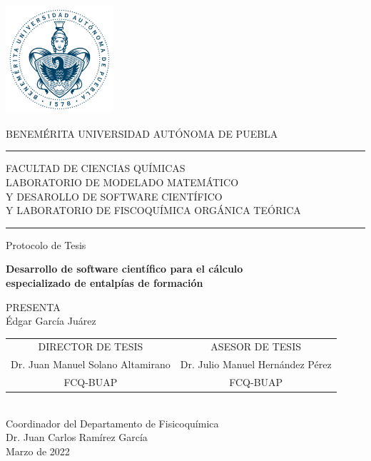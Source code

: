\documentclass[12pt]{article}
\newcommand\vtab[1][0.5cm]{\vspace*{#1}}
\begin{document}
\pagestyle{empty} 
\phantom{a}
\vspace{-1.4cm}
\begin{center}
\includegraphics[width=4cm]{Images/buap2014.png}

BENEMÉRITA UNIVERSIDAD AUTÓNOMA DE PUEBLA\\
\rule{150mm}{0.1mm}
\begin{small}
FACULTAD DE CIENCIAS QUÍMICAS\\
LABORATORIO DE MODELADO MATEMÁTICO\\
Y DESAROLLO DE SOFTWARE CIENTÍFICO\\
Y LABORATORIO DE FISCOQUÍMICA ORGÁNICA TEÓRICA\\
\end{small}
\rule{150mm}{0.1mm}

\vtab[.1cm]
\Large{Protocolo de Tesis}\\
\vtab[0.2cm]

\large{\textbf{Desarrollo de software científico para el cálculo\\
especializado de entalpías de formación}}\\
\vtab[0.2cm]

PRESENTA \\
Édgar García Juárez \\
\vtab[0.5cm]
\begin{tabular}{cc}
DIRECTOR DE TESIS & ASESOR DE TESIS \\ 
Dr. Juan Manuel Solano Altamirano & Dr. Julio Manuel Hernández Pérez \\ 
FCQ-BUAP & FCQ-BUAP \\ 
\end{tabular} 
\vtab[0.7cm] \\
\large{Coordinador del Departamento de Fisicoquímica\\
Dr. Juan Carlos Ramírez García}\\
\vtab[0.2cm]
{\small Marzo de 2022}
\end{center}
\end{document}
